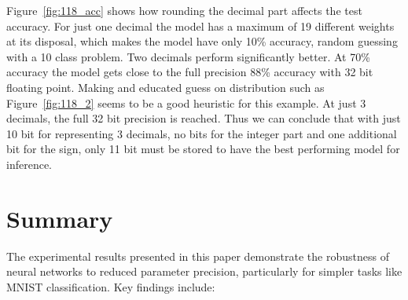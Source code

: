 \documentclass[11pt]{article}
\begin{document}
Figure~\ref{fig:118_acc} shows how rounding the decimal part affects the test accuracy.
For just one decimal the model has a maximum of 19 different weights at its disposal,
which makes the model have only 10\% accuracy, random guessing with a 10 class problem.
Two decimals perform significantly better. At 70\% accuracy the model gets close to the
full precision 88\% accuracy with 32 bit floating point. Making and educated guess on
distribution such as Figure~\ref{fig:118_2} seems to be a good heuristic for this example.
At just 3 decimals, the full 32 bit precision is reached. Thus we can conclude that with
just 10 bit for representing 3 decimals, no bits for the integer part and one additional
bit for the sign, only 11 bit must be stored to have the best performing model for
inference.


\section{Summary}


The experimental results presented in this paper demonstrate the robustness of neural
networks to reduced parameter precision, particularly for simpler tasks like MNIST
classification. Key findings include:
\end{document}
